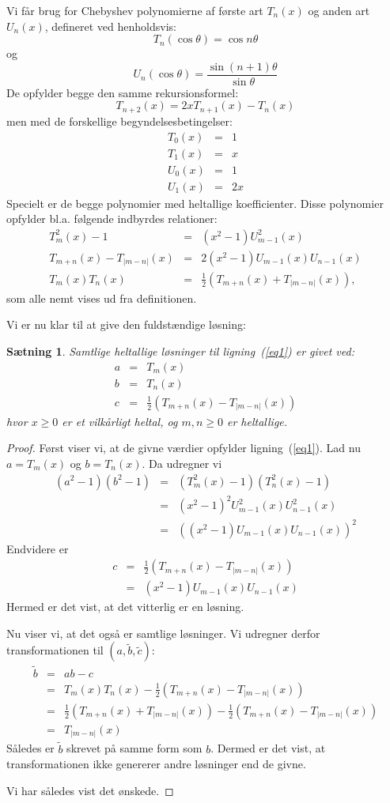 \documentclass[12pt,oneside,a4paper]{article}
\newcommand{\bas}{\begin{eqnarray*}}
\newcommand{\eas}{\end{eqnarray*}}
\newtheorem{thm}{Sætning}[section]
\begin{document}
Vi får brug for Chebyshev polynomierne af første art $T_n(x)$ og anden art
$U_n(x)$, defineret ved henholdsvis:
$$
T_n(\cos\theta) = \cos n\theta
$$
og
$$
U_n(\cos\theta) = \frac{\sin (n+1)\theta}{\sin\theta}
$$
De opfylder begge den samme rekursionsformel:
$$
T_{n+2}(x) = 2xT_{n+1}(x) - T_n(x)
$$
men med de forskellige begyndelsesbetingelser:
\bas
T_0(x) &=& 1 \\
T_1(x) &=& x \\
U_0(x) &=& 1 \\
U_1(x) &=& 2x
\eas
Specielt er de begge polynomier med heltallige koefficienter.
Disse polynomier opfylder bl.a. følgende indbyrdes relationer:
\bas
T_m^2(x) - 1 &=& (x^2-1)U_{m-1}^2(x) \\
T_{m+n}(x) - T_{|m-n|}(x) &=& 2(x^2-1)U_{m-1}(x)U_{n-1}(x) \\
T_m(x) T_n(x) &=& \frac12 \left(T_{m+n}(x) + T_{|m-n|}(x)\right),
\eas
som alle nemt vises ud fra definitionen.

Vi er nu klar til at give den fuldstændige løsning:
\begin{thm}
    Samtlige heltallige løsninger til ligning~(\ref{eq1}) er givet ved:
    \bas
    a &=& T_m(x) \\
    b &=& T_n(x) \\
    c &=& \frac 12 \left(T_{m+n}(x) - T_{|m-n|}(x)\right) 
    \eas
    hvor $x\ge 0$ er et vilkårligt heltal, og $m,n \ge 0$ er heltallige.
\end{thm}
\begin{proof}
    Først viser vi, at de givne værdier opfylder ligning~(\ref{eq1}). 
Lad nu $a=T_m(x)$ og $b = T_n(x)$. Da udregner vi 
\bas
(a^2-1)(b^2-1) &=& (T_m^2(x)-1)(T_n^2(x)-1) \\
                        &=& (x^2-1)^2 U_{m-1}^2(x) U_{n-1}^2(x) \\
                        &=& \left( (x^2-1) U_{m-1}(x) U_{n-1}(x)\right)^2
\eas
Endvidere er 
\bas
c &=& \frac 12 \left(T_{m+n}(x) - T_{|m-n|}(x)\right) \\
&=& (x^2-1) U_{m-1}(x) U_{n-1}(x) 
\eas
Hermed er det vist, at det vitterlig er en løsning.

Nu viser vi, at det også er samtlige løsninger. Vi udregner derfor
transformationen til $(a,\tilde b,\tilde c)$:
\bas
\tilde b &=& a b - c \\
  &=& T_m(x) T_n(x) - \frac 12 \left(T_{m+n}(x) - T_{|m-n|}(x)\right) \\
  &=& \frac12 \left(T_{m+n}(x) + T_{|m-n|}(x)\right) - \frac 12 \left(T_{m+n}(x) - T_{|m-n|}(x)\right) \\
  &=& T_{|m-n|}(x)
\eas
Således er $\tilde b$ skrevet på samme form som $b$. Dermed er det vist, at transformationen ikke genererer andre løsninger end de givne.

Vi har således vist det ønskede.

\end{proof}
\end{document}
